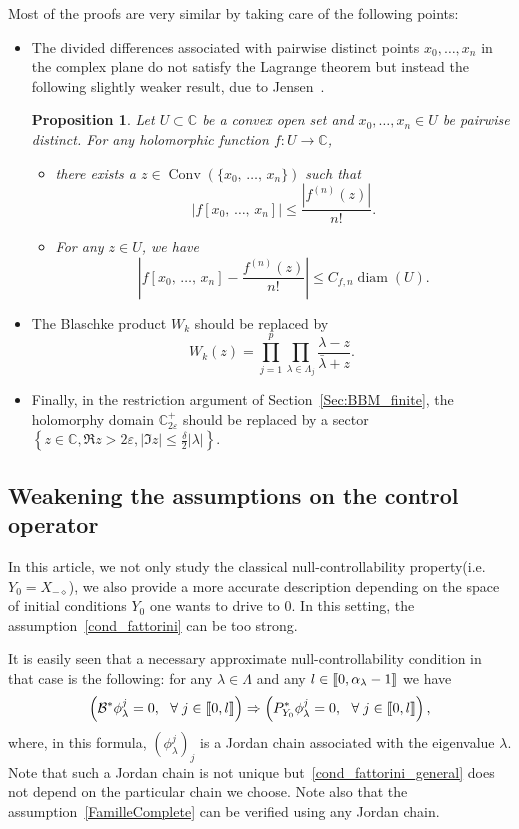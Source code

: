 \documentclass[11pt]{article}
\newtheorem{prop}[theo]{Proposition}
\theoremstyle{definition}
\numberwithin{equation}{section}
\numberwithin{figure}{section}
\numberwithin{table}{section}
\DeclareMathOperator{\Conv}{Conv}
\newcommand{\llbracket}{\mathopen{[\mkern -2.7mu[}}
\newcommand{\rrbracket}{\mathclose{]\mkern -2.7mu]}}
\newcommand{\inter}[2]{\llbracket #1,#2 \rrbracket}
\newcommand\Bs{\mathcal{B}^*}
\newcommand{\Xmalpha}{X_{-\diamond}}
\newcommand{\Fzp}{Y_0}
\newcommand{\PFa}{P_{\Fzp}^*}
\newcommand{\C}{\mathbb{C}}
\newcommand{\Cpeps}{\mathbb{C}^+_{2\varepsilon}}
\DeclareMathOperator{\diam}{diam}
\let\oldforall\forall
\renewcommand*{\forall}{\mathrel{\oldforall}}
\begin{document}
Most of the proofs are very similar by taking care of the following points:
\begin{itemize}
\item The divided differences associated with pairwise distinct points $x_0,\dotsc,x_n$ in the complex plane do not satisfy the Lagrange theorem but instead the following slightly weaker result, due to Jensen~\cite{Jensen_1894}.
\begin{prop}
Let $U\subset \C$ be a convex open set and $x_0,\dotsc,x_n\in U$ be pairwise distinct. For any holomorphic function $f:U\to \C$,
\begin{itemize}
\item there exists a $z\in \Conv(\{x_0,\,\dotsc,\,x_n\})$ such that
\[
|f[x_0,\,\dotsc,\,x_n]| \leq \frac{\left|f^{(n)}(z)\right|}{n!}.
\]
\item For any $z\in U$, we have
\[
\left|f[x_0,\,\dotsc,\,x_n] - \frac{f^{(n)}(z)}{n!}\right| \leq C_{f,n} \diam(U).
\]
\end{itemize}
\end{prop}
\item The Blaschke product $W_k$ should be replaced by
\[
W_k(z)=\prod_{j=1}^p \prod_{\lambda\in \Lambda_j} \frac{\lambda - z}{\bar{\lambda} + z}.
\]
\item Finally, in the restriction argument of Section~\ref{Sec:BBM_finite}, the holomorphy domain $\Cpeps$ should be replaced by a sector $\left\{z\in \C, \Re z>2\varepsilon, |\Im z|\leq \frac{\delta}{2} |\lambda|\right\}$.
\end{itemize}


\subsection{Weakening the assumptions on the control operator} \label{Sec:Gestion_de_B*}

In this article, we not only study the classical null-controllability property\linebreak(i.e.$\Fzp=\Xmalpha$), we also provide a more accurate description depending on the space of initial conditions $\Fzp$ one wants to drive to $0$. In this setting, the assumption~\eqref{cond_fattorini} can be too strong.

It is easily seen that a necessary approximate null-controllability condition in that case is the following: for any $\lambda\in \Lambda$ and any $l\in \inter{0}{\alpha_\lambda-1}$ we have
\begin{equation}\label{cond_fattorini_general}
\left(\Bs \phi_\lambda^j=0, \ \ \forall j\in \inter{0}{l}\right) \Rightarrow \left(\PFa \phi_\lambda^j=0, \ \ \forall j\in\inter{0}{l}\right),
\end{equation}
where, in this formula, $(\phi_\lambda^j)_j$ is a Jordan chain associated with the eigenvalue $\lambda$. Note that such a Jordan chain is not unique but~\eqref{cond_fattorini_general} does not depend on the particular chain we choose. Note also that the assumption~\eqref{FamilleComplete} can be verified using any Jordan chain.
\end{document}
